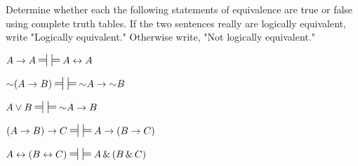 \noindent\problempart
\label{pr.TT.equiv}
Determine whether each the following statements of equivalence are true or false using complete truth tables. If the two sentences really are logically equivalent, write "Logically equivalent." Otherwise write, "Not logically equivalent." 
\begin{earg}
\item $A\eif A\ndststile{}{} \hspace{.5em} \sdtstile{}{} A \eiff A$ \vspace{.5ex}%
\item $\enot(A \eif B)\ndststile{}{} \hspace{.5em} \sdtstile{}{} \enot A \eif \enot B$\vspace{.5ex} %
\item $A \eor B\ndststile{}{} \hspace{.5em} \sdtstile{}{} \enot A \eif B$ \vspace{.5ex}%
\item$(A \eif B) \eif C\ndststile{}{} \hspace{.5em} \sdtstile{}{} A \eif (B \eif C)$\vspace{.5ex} %
\item $A \eiff (B \eiff C)\ndststile{}{} \hspace{.5em} \sdtstile{}{} A \eand (B \eand C)$ \vspace{.5ex}%
\end{earg}


